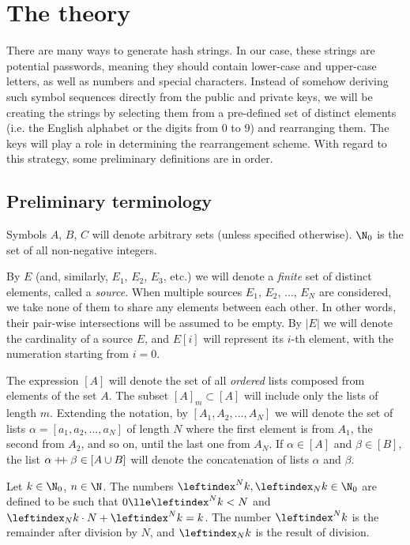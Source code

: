 \documentclass[12pt, a4paper]{article}
\newcommand{\dop}{\mathbin{{+}\hspace{-1mm}{+}}}
\newcommand{\lli}[1]{\leftindex_#1}
\newcommand{\lui}[1]{\leftindex^#1}
\begin{document}
\section{The theory}

There are many ways to generate hash strings. In our case, these strings are potential passwords, meaning they should contain lower-case and upper-case letters, as well as numbers and special characters. Instead of somehow deriving such symbol sequences directly from the public and private keys, we will be creating the strings by selecting them from a pre-defined set of distinct elements (i.e. the English alphabet or the digits from 0 to 9) and rearranging them. The keys will play a role in determining the rearrangement scheme. With regard to this strategy, some preliminary definitions are in order.

\subsection{Preliminary terminology}

Symbols $ A $, $ B $, $ C $ will denote arbitrary sets (unless specified otherwise). $ \N_0 $ is the set of all non-negative integers.

By $ E $ (and, similarly, $ E_1 $, $ E_2 $, $ E_3 $, etc.) we will denote a \emph{finite} set of distinct elements, called a \emph{source}. When multiple sources $ E_1 $, $ E_2 $, ..., $ E_N $ are considered, we take none of them to share any elements between each other. In other words, their pair-wise intersections will be assumed to be empty. By $ |E| $ we will denote the cardinality of a source $ E $, and $ E[i] $ will represent its $ i $-th element, with the numeration starting from $ i = 0 $.

The expression $ [A] $ will denote the set of all \emph{ordered} lists composed from elements of the set $ A $. The subset $ [A]_m \subset [A] $ will include only the lists of length $ m $. Extending the notation, by $ [A_1, A_2, ..., A_N] $ we will denote the set of lists $ \alpha = [a_1, a_2, ..., a_N] $ of length $ N $ where the first element is from $ A_1 $, the second from $ A_2 $, and so on, until the last one from $ A_N $. If $ \alpha \in [A] $ and $ \beta \in [B] $, the list $ \alpha \dop \beta \in [A \cup B] $ will denote the concatenation of lists $ \alpha $ and $ \beta $.

Let $ k \in \N_0 $, $ n \in \N $. The numbers $ \lui{N}k, \lli{N}k \in \N_0 $ are defined to be such that $ 0 \lle \lui{N}k < N $ and $ \lli{N}k \cdot N + \lui{N}k = k $. The number $ \lui{N}k $ is the remainder after division by $ N $, and $ \lli{N}k $ is the result of division.
\end{document}
